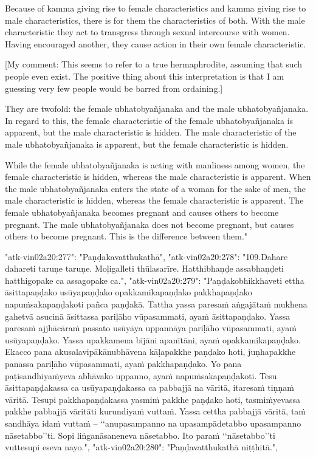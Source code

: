 Because of kamma giving rise to female characteristics and kamma giving rise to male characteristics, there is for them the characteristics of both. With the male characteristic they act to transgress through sexual intercourse with women. Having encouraged another, they cause action in their own female characteristic. 

[My comment: This seems to refer to a true hermaphrodite, assuming that such people even exist. The positive thing about this interpretation is that I am guessing very few people would be barred from ordaining.] 

They are twofold: the female ubhatobyañjanaka and the male ubhatobyañjanaka. In regard to this, the female characteristic of the female ubhatobyañjanaka is apparent, but the male characteristic is hidden. The male characteristic of the male ubhatobyañjanaka is apparent, but the female characteristic is hidden. 

While the female ubhatobyañjanaka is acting with manliness among women, the female characteristic is hidden, whereas the male characteristic is apparent. 
When the male ubhatobyañjanaka enters the state of a woman for the sake of men, the male characteristic is hidden, whereas the female characteristic is apparent. 
The female ubhatobyañjanaka becomes pregnant and causes others to become pregnant. The male ubhatobyañjanaka does not become pregnant, but causes others to become pregnant. This is the difference between them."



  "atk-vin02a20:277": "Paṇḍakavatthukathā",
  "atk-vin02a20:278": "109.Dahare dahareti taruṇe taruṇe. Moḷigalleti thūlasarīre. Hatthibhaṇḍe assabhaṇḍeti hatthigopake ca assagopake ca.",
  "atk-vin02a20:279": "Paṇḍakobhikkhaveti ettha āsittapaṇḍako usūyapaṇḍako opakkamikapaṇḍako pakkhapaṇḍako napuṁsakapaṇḍakoti pañca paṇḍakā. Tattha yassa paresaṁ aṅgajātaṁ mukhena gahetvā asucinā āsittassa pariḷāho vūpasammati, ayaṁ āsittapaṇḍako. Yassa paresaṁ ajjhācāraṁ passato usūyāya uppannāya pariḷāho vūpasammati, ayaṁ usūyapaṇḍako. Yassa upakkamena bījāni apanītāni, ayaṁ opakkamikapaṇḍako. Ekacco pana akusalavipākānubhāvena kāḷapakkhe paṇḍako hoti, juṇhapakkhe panassa pariḷāho vūpasammati, ayaṁ pakkhapaṇḍako. Yo pana paṭisandhiyaṁyeva abhāvako uppanno, ayaṁ napuṁsakapaṇḍakoti. Tesu āsittapaṇḍakassa ca usūyapaṇḍakassa ca pabbajjā na vāritā, itaresaṁ tiṇṇaṁ vāritā. Tesupi pakkhapaṇḍakassa yasmiṁ pakkhe paṇḍako hoti, tasmiṁyevassa pakkhe pabbajjā vāritāti kurundiyaṁ vuttaṁ. Yassa cettha pabbajjā vāritā, taṁ sandhāya idaṁ vuttaṁ – ‘‘anupasampanno na upasampādetabbo upasampanno nāsetabbo’’ti. Sopi liṅganāsaneneva nāsetabbo. Ito paraṁ ‘‘nāsetabbo’’ti vuttesupi eseva nayo.",
  "atk-vin02a20:280": "Paṇḍavatthukathā niṭṭhitā.",

